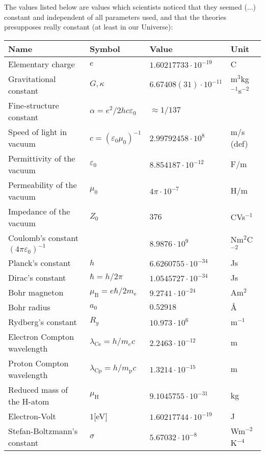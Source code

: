 	The values listed below are values which scientists noticed that they seemed (...) constant and independent of all parameters used, and that the theories presupposes really constant (at least in our Universe):	
	\begin{center}
	\begin{tabular}{||l|lll||}
	\hline
	{\textbf{Name}}&{\textbf{Symbol}}&{\textbf{Value}}&{\textbf{Unit}}\\
	\hline
	\hline
	Elementary charge            &$e$&$1.60217733\cdot10^{-19}$&C\rule{0pt}{13pt}\\
	Gravitational constant       &$G,\kappa$&$6.67408(31)\cdot10^{-11}$&m$^3$kg$^{-1}$s$^{-2}$\\
	Fine-structure constant      &$\alpha=e^2/2hc\varepsilon_0$&$\approx1/137$&\\
	Speed of light in vacuum     &$c=(\varepsilon_0\mu_0)^{-1}$&$2.99792458\cdot10^8$&m/s (def)\\
	Permittivity of the vacuum   &$\varepsilon_0$&$8.854187\cdot10^{-12}$&F/m\\
	Permeability of the vacuum   &$\mu_0$&$4\pi\cdot10^{-7}$&H/m\\
	Impedance of the vacuum   &$Z_0$&$376$&CVs$^{-1}$\\
	Coulomb's constant $(4\pi\varepsilon_0)^{-1}$   &&$8.9876\cdot10^9$&Nm$^2$C$^{-2}$\\
	\hline
	Planck's constant            &$h$&$6.6260755\cdot10^{-34}$&Js\rule{0pt}{13pt}\\
	Dirac's constant             &$\hbar=h/2\pi$&$1.0545727\cdot10^{-34}$&Js\\
	Bohr magneton                &$\mu_{\text{B}}=e\hbar/2m_{\text{e}}$&$9.2741\cdot10^{-24}$&Am$^2$\\
	Bohr radius                  &$a_0$&$0.52918$&\AA\\
	Rydberg's constant           &$R_y$&$10.973\cdot 10^{6}$& m$^{-1}$\\
	Electron Compton wavelength  &$\lambda_{\text{Ce}}=h/m_e c$&$2.2463\cdot 10^{-12}$&m\\
	Proton Compton wavelength    &$\lambda_{\text{Cp}}=h/m_{\text{p}}c$&$1.3214\cdot 10^{-15}$&m\\
	Reduced mass of the H-atom   &$\mu_{\text{H}}$&$9.1045755\cdot 10^{-31}$&kg\\
	Electron-Volt   &$1$[eV]&$1.60217744\cdot 10^{-19}$&J\\
	\hline
	Stefan-Boltzmann's constant  &$\sigma$&$5.67032\cdot 10^{-8}$&Wm$^{-2}$K$^{-4}$\rule{0pt}{13pt}\\

\end{tabular}
\end{center}
